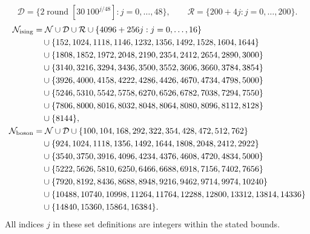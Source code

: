 \begin{equation}\mathcal D=\{2\operatorname{round}[30\,100^{j/48}]:j=0,\ldots,48\},\qquad \mathcal R=\{200+4j:j=0,\ldots,200\}.\label{eq:num-dense-grid}\end{equation}
\begin{align}
\mathcal N_{\rm ising}&=\mathcal N\cup\mathcal D\cup\mathcal R\cup\{4096+256j:j=0,\ldots,16\}\nonumber\\
&\quad\cup\{152,1024,1118,1146,1232,1356,1492,1528,1604,1644\}\nonumber\\
&\quad\cup\{1808,1852,1972,2048,2190,2354,2412,2654,2890,3000\}\nonumber\\
&\quad\cup\{3140,3216,3294,3436,3500,3552,3606,3660,3784,3854\}\nonumber\\
&\quad\cup\{3926,4000,4158,4222,4286,4426,4670,4734,4798,5000\}\nonumber\\
&\quad\cup\{5246,5310,5542,5758,6270,6526,6782,7038,7294,7550\}\nonumber\\
&\quad\cup\{7806,8000,8016,8032,8048,8064,8080,8096,8112,8128\}\nonumber\\
&\quad\cup\{8144\},\nonumber\\
\mathcal N_{\rm boson}&=\mathcal N\cup\mathcal D\cup\{100,104,168,292,322,354,428,472,512,762\}\nonumber\\
&\quad\cup\{924,1024,1118,1356,1492,1644,1808,2048,2412,2922\}\nonumber\\
&\quad\cup\{3540,3750,3916,4096,4234,4376,4608,4720,4834,5000\}\nonumber\\
&\quad\cup\{5222,5626,5810,6250,6466,6688,6918,7156,7402,7656\}\nonumber\\
&\quad\cup\{7920,8192,8436,8688,8948,9216,9462,9714,9974,10240\}\nonumber\\
&\quad\cup\{10488,10740,10998,11264,11764,12288,12800,13312,13814,14336\}\nonumber\\
&\quad\cup\{14840,15360,15864,16384\}.
\label{eq:num-extended-grid}\end{align}
All indices $j$ in these set definitions are integers within the stated bounds.
